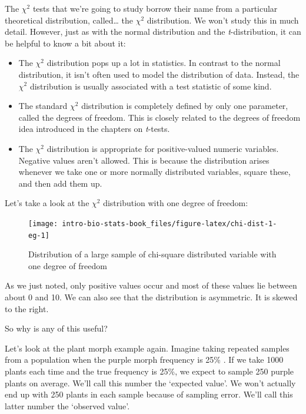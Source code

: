 \documentclass[
]{book}
\providecommand{\tightlist}{%
  \setlength{\itemsep}{0pt}\setlength{\parskip}{0pt}}
\begin{document}
The \(\chi^2\) tests that we're going to study borrow their name from a particular theoretical distribution, called\ldots{} the \(\chi^2\) distribution. We won't study this in much detail. However, just as with the normal distribution and the \emph{t}-distribution, it can be helpful to know a bit about it:

\begin{itemize}
\tightlist
\item
  The \(\chi^2\) distribution pops up a lot in statistics. In contrast to the normal distribution, it isn't often used to model the distribution of data. Instead, the \(\chi^2\) distribution is usually associated with a test statistic of some kind.
\item
  The standard \(\chi^2\) distribution is completely defined by only one parameter, called the degrees of freedom. This is closely related to the degrees of freedom idea introduced in the chapters on \emph{t}-tests.
\item
  The \(\chi^2\) distribution is appropriate for positive-valued numeric variables. Negative values aren't allowed. This is because the distribution arises whenever we take one or more normally distributed variables, square these, and then add them up.
\end{itemize}

Let's take a look at the \(\chi^2\) distribution with one degree of freedom:

\begin{figure}

{\centering \texttt{[image: intro-bio-stats-book\_files/figure-latex/chi-dist-1-eg-1]} 

}

\caption{Distribution of a large sample of chi-square distributed variable with one degree of freedom}\label{fig:chi-dist-1-eg}
\end{figure}

As we just noted, only positive values occur and most of these values lie between about 0 and 10. We can also see that the distribution is asymmetric. It is skewed to the right.

So why is any of this useful?

Let's look at the plant morph example again. Imagine taking repeated samples from a population when the purple morph frequency is 25\% . If we take 1000 plants each time and the true frequency is 25\%, we expect to sample 250 purple plants on average. We'll call this number the `expected value'. We won't actually end up with 250 plants in each sample because of sampling error. We'll call this latter number the `observed value'.
\end{document}
